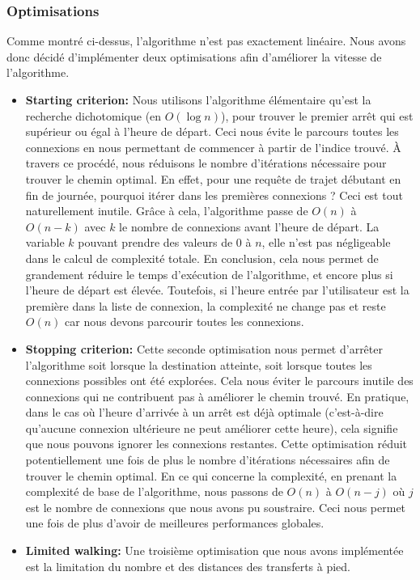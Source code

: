 \documentclass[12pt]{article}
\begin{document}
\subsubsection{Optimisations}
Comme montré ci-dessus, l'algorithme n'est pas exactement linéaire. Nous avons donc décidé d'implémenter deux optimisations afin d'améliorer la vitesse de l'algorithme.
\begin{itemize}
    \item \textbf{Starting criterion:} Nous utilisons l'algorithme élémentaire qu'est la recherche dichotomique (en $O(\log n)$), pour trouver le premier arrêt 
    qui est supérieur ou égal à l'heure de départ. Ceci nous évite le parcours toutes les connexions en nous permettant de commencer à partir de l'indice trouvé.
    À travers ce procédé, nous réduisons le nombre d'itérations nécessaire pour trouver le chemin optimal. En effet, pour une requête de trajet débutant en fin
    de journée, pourquoi itérer dans les premières connexions ? Ceci est tout naturellement inutile. Grâce à cela, l'algorithme passe de $O(n)$ à $O(n - k)$ 
    avec $k$ le nombre de connexions avant l'heure de départ. La variable $k$ pouvant prendre des valeurs de $0$ à $n$, elle n'est pas négligeable dans le calcul
    de complexité totale. En conclusion, cela nous permet de grandement réduire le temps d'exécution de l'algorithme, et encore plus si l'heure de départ est
    élevée. Toutefois, si l'heure entrée par l'utilisateur est la première dans la liste de connexion, la complexité ne change pas et reste $O(n)$ car nous
    devons parcourir toutes les connexions.
    \item \textbf{Stopping criterion:} Cette seconde optimisation nous permet d'arrêter l'algorithme soit lorsque la destination atteinte, soit lorsque toutes 
    les connexions possibles ont été explorées. Cela nous éviter le parcours inutile des connexions qui ne contribuent pas à améliorer le chemin trouvé. 
    En pratique, dans le cas où l'heure d'arrivée à un arrêt est déjà optimale (c'est-à-dire qu'aucune connexion ultérieure ne peut améliorer cette heure), cela signifie
    que nous pouvons ignorer les connexions restantes. Cette optimisation réduit potentiellement une fois de plus le nombre d'itérations nécessaires afin de trouver le
    chemin optimal. En ce qui concerne la complexité, en prenant la complexité de base de l'algorithme, nous passons de $O(n)$ à $O(n - j)$ où $j$ est le nombre de 
    connexions que nous avons pu soustraire. Ceci nous permet une fois de plus d'avoir de meilleures performances globales.
    \item \textbf{Limited walking:} Une troisième optimisation que nous avons implémentée est la limitation du nombre et des distances des transferts à pied. 

\end{itemize}
\end{document}

